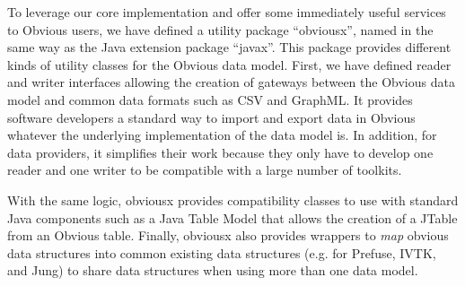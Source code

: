 To leverage our core implementation and offer some immediately useful
services to Obvious users, we have defined a utility package
``obviousx'', named in the same way as the Java extension package
``javax''.  This package provides different kinds of utility classes
for the Obvious data model.  First, we have defined reader and writer
interfaces allowing the creation of gateways between the Obvious data
model and common data formats such as CSV and GraphML.  It provides
software developers a standard way to import and export data in
Obvious whatever the underlying implementation of the data model
is.  In addition, for data providers, it simplifies their work because
they only have to develop one reader and one writer to be compatible
with a large number of toolkits.

With the same logic, obviousx provides compatibility classes to use
with standard Java components such as a Java Table Model that allows
the creation of a JTable from an Obvious table.  Finally, obviousx
also provides wrappers to \emph{map} obvious data structures into
common existing data structures (e.g. for Prefuse, IVTK, and Jung) to share data structures when using more than one
data model.

